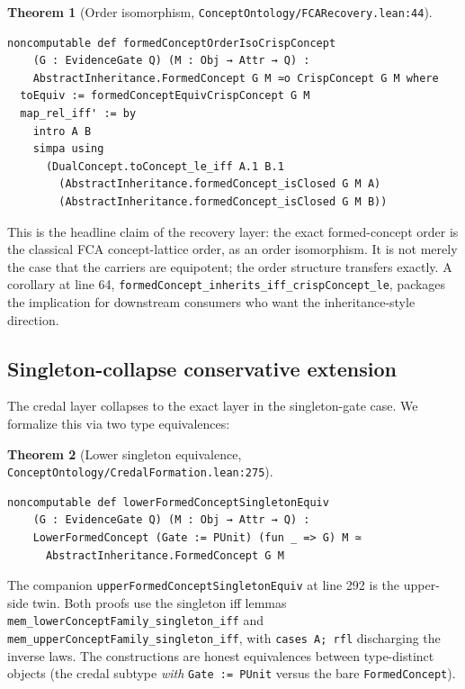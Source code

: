 \documentclass[]{article}
\newtheorem{theorem}{Theorem}
\newcommand{\lid}[1]{{\ttfamily\nolinkurl{#1}}}
\newcommand{\lpath}[1]{\texttt{\nolinkurl{#1}}}
\begin{document}
\begin{theorem}[Order isomorphism,
\lpath{ConceptOntology/FCARecovery.lean:44}]\label{thm:fca-order}
\begin{lstlisting}
noncomputable def formedConceptOrderIsoCrispConcept
    (G : EvidenceGate Q) (M : Obj → Attr → Q) :
    AbstractInheritance.FormedConcept G M ≃o CrispConcept G M where
  toEquiv := formedConceptEquivCrispConcept G M
  map_rel_iff' := by
    intro A B
    simpa using
      (DualConcept.toConcept_le_iff A.1 B.1
        (AbstractInheritance.formedConcept_isClosed G M A)
        (AbstractInheritance.formedConcept_isClosed G M B))
\end{lstlisting}
\end{theorem}

\noindent This is the headline claim of the recovery layer: the exact formed-concept
order is the classical FCA concept-lattice order, as an order isomorphism. It is
not merely the case that the carriers are equipotent; the order structure transfers
exactly. A corollary at line 64,
\lid{formedConcept\_inherits\_iff\_crispConcept\_le}, packages the implication for
downstream consumers who want the inheritance-style direction.

\subsection{Singleton-collapse conservative extension}

The credal layer collapses to the exact layer in the singleton-gate case. We
formalize this via two type equivalences:

\begin{theorem}[Lower singleton equivalence,
\lpath{ConceptOntology/CredalFormation.lean:275}]\label{thm:lower-singleton}
\begin{lstlisting}
noncomputable def lowerFormedConceptSingletonEquiv
    (G : EvidenceGate Q) (M : Obj → Attr → Q) :
    LowerFormedConcept (Gate := PUnit) (fun _ => G) M ≃
      AbstractInheritance.FormedConcept G M
\end{lstlisting}
\end{theorem}

\noindent The companion \lid{upperFormedConceptSingletonEquiv} at line 292 is the
upper-side twin. Both proofs use the singleton iff lemmas
\lid{mem\_lowerConceptFamily\_singleton\_iff} and
\lid{mem\_upperConceptFamily\_singleton\_iff}, with \lid{cases A; rfl} discharging
the inverse laws. The constructions are honest equivalences between type-distinct
objects (the credal subtype \emph{with} \lid{Gate := PUnit} versus the bare
\lid{FormedConcept}).
\end{document}
